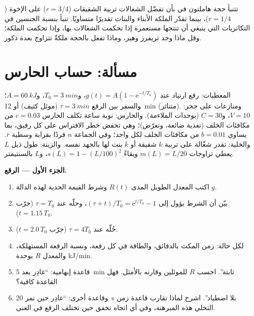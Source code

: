\begin{exercise}[$\star\star\star$]\label{exo:b3:behavioural-ecology:12}
تتنبأ حجة هاملتون في  بأن تفضّل الشغالات
تربية الشقيقات ($r = 3/4$) على الإخوة ($r = 1/4$)، بينما تقدّر
الملكة الأبناء والبنات تقديرًا متساويًا. تنبأ بنسبة الجنسين في
التكاثريات التي ينبغي أن تنتجها مستعمرة إذا تحكمت الشغالات
بها، وإذا تحكمت الملكة؛ وقل ماذا وجد تريفرز وهير، وماذا تفعل
بالحجة ملكةٌ تتزاوج بعدة ذكور.
\end{exercise}

\section{مسألة: حساب الحارس}

\begin{problem}
\label{pb:b3:behavioural-ecology:1}
المعطيات: رقع ارتياد عند $g(t) = A(1 - \mathrm{e}^{-t/T_{0}})$، و$T_{0}
= \qty{3}{min}$، و$A = \qty{60}{kJ}$؛ والسفر بين الرقع $\tau =
\qty{3}{min}$ (موئل كثيف) أو \qty{12}{min} (متناثر). ومنازعات على
جحر: $V = 10$، و$C = 30$ (بوحدات الملاءمة). والحارس: نوبة ساعة
تكلف الحارس $c = 0.03$ من مكافئات الخلف (تغذية ضائعة،
وتعرّض)؛ وهي تخفض خطر الافتراس على كل رفيق، بما يساوي $b = 0.01$
من مكافئات الخلف لكل واحد؛ وفي الجماعة $n$ فردًا بقرابة وسطية
$\bar r$. والخلية: تقدر شغّالة على تربية $k$ شقيقة أو $k$
بنت لها بالجهد نفسه. والزينة: طول ذيل $L$ يعطي تزاوجات
$m(L) = L/20$ وبقاءً $s(L) = 1 - (L/100)^{2}$، و$L$ بالسنتيمتر.

\medskip
\noindent\textbf{الجزء الأول --- الرقع.}
\begin{enumerate}
  \item اكتب المعدل الطويل المدى $R(t)$ وشرط القيمة الحدية
        لهذه الدالة $g$.
  \item بيّن أن الشرط يؤول إلى $(\tau + t)/T_{0} = \mathrm{e}^{t/T_{0}}
        - 1$، وحلّه عند $\tau = T_{0}$ (جرّب $t = 1.15\,T_{0}$).
  \item حُلّه عند $\tau = 4T_{0}$ (جرّب $t = 2.0\,T_{0}$).
  \item لكل حالة: زمن المكث بالدقائق، والطاقة في كل رقعة،
        ونسبة الرقعة المستهلكة، والمعدل $R$ بوحدة kJ/min.
  \item قاعدة إبهامية: ``غادِر بعد \qty{5}{min} ثابتة''. احسب
        $R$ للموئلين وقارنه بالأمثل. فهل القاعدة كافية؟
  \item وقاعدة أخرى: ``غادِر حين تمر \qty{20}{s} بلا
        اصطياد''. اشرح لماذا تقارب قاعدة زمن التخلي هذه
        المبرهنة، وفي أي اتجاه تخفق حين تختلف الرقع في الغنى.
\end{enumerate}


\end{problem}
